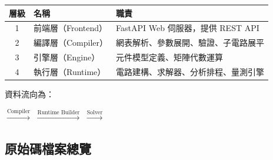 \documentclass[12pt,a4paper]{article}
\begin{document}
\begin{center}
\begin{tabular}{|c|l|l|}
\hline
\textbf{層級} & \textbf{名稱} & \textbf{職責} \\
\hline
1 & 前端層（Frontend） & FastAPI Web 伺服器，提供 REST API \\
2 & 編譯層（Compiler） & 網表解析、參數展開、驗證、子電路展平 \\
3 & 引擎層（Engine） & 元件模型定義、矩陣代數運算 \\
4 & 執行層（Runtime） & 電路建構、求解器、分析排程、量測引擎 \\
\hline
\end{tabular}
\end{center}

\noindent 資料流向為：

\begin{center}
 $\xrightarrow{\text{Compiler}}$
 $\xrightarrow{\text{Runtime Builder}}$
 $\xrightarrow{\text{Solver}}$
\end{center}

\subsection{原始碼檔案總覽}
\end{document}
